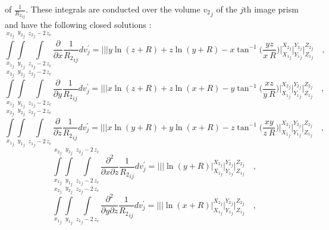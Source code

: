 \documentclass[journal abbreviation, manuscript]{copernicus}
\begin{document}
of ${\frac{1}{{R_2}_{ij}}}$.
These integrals are conducted over the volume ${v_{2}}_{j}$ of the $j$th image prism and have the following closed solutions \citep{Nagyetal2000, Nagyetal2002}:
\begin{equation}
\int\limits_{{x_{1}}_{j}}^{{x_{2}}_{j}} \int\limits_{{y_{1}}_{j}}^{{y_{2}}_{j}} \int\limits_{{z_{1}}_{j} - 2 \, z_c}^{{z_{2}}_{j} - 2 \, z_c}
\frac{\partial }{\partial x} {\frac{1}{{R_2}_{ij}}} dv_{j}^{\prime} =
\Bigg|\Bigg|\Bigg| 
y \ln(z + R) + z \ln(y + R) -  x  \tan^{-1} \Bigg( \frac{yz}{x \: R} \Bigg) 
\Bigg|_{{X_1}_{j}}^{{X_2}_{j}} \Bigg|_{{Y_1}_{j}}^{{Y_2}_{j}} \Bigg|_{{Z_1}_{j}}^{{Z_2}_{j}} \quad ,
\label{dx2}
\end{equation}
\begin{equation}
\int\limits_{{x_{1}}_{j}}^{{x_{2}}_{j}} \int\limits_{{y_{1}}_{j}}^{{y_{2}}_{j}} \int\limits_{{z_{1}}_{j} - 2 \, z_c}^{{z_{2}}_{j} - 2 \, z_c}
\frac{\partial }{\partial y} {\frac{1}{{R_2}_{ij}}} dv_{j}^{\prime} =
\Bigg|\Bigg|\Bigg|
x \ln(z + R) + z \ln(x + R) -  y  \tan^{-1} \Bigg( \frac{xz}{y \: R} 
\Bigg)
\Bigg|_{{X_1}_{j}}^{{X_2}_{j}} \Bigg|_{{Y_1}_{j}}^{{Y_2}_{j}} \Bigg|_{{Z_1}_{j}}^{{Z_2}_{j}} \quad ,
\label{dy2}
\end{equation}
\begin{equation}
\int\limits_{{x_{1}}_{j}}^{{x_{2}}_{j}} \int\limits_{{y_{1}}_{j}}^{{y_{2}}_{j}} \int\limits_{{z_{1}}_{j} - 2 \, z_c}^{{z_{2}}_{j} - 2 \, z_c}
\frac{\partial }{\partial z} {\frac{1}{{R_2}_{ij}}} dv_{j}^{\prime} =
\Bigg|\Bigg|\Bigg|
x \ln(y + R) + y \ln(x + R) -  z  \tan^{-1} \Bigg( \frac{xy}{z \: R} \Bigg) 
\Bigg|_{{X_1}_{j}}^{{X_2}_{j}} \Bigg|_{{Y_1}_{j}}^{{Y_2}_{j}} \Bigg|_{{Z_1}_{j}}^{{Z_2}_{j}} \quad ,
\label{dz2}
\end{equation}
\begin{equation}
\int\limits_{{x_{1}}_{j}}^{{x_{2}}_{j}} \int\limits_{{y_{1}}_{j}}^{{y_{2}}_{j}} \int\limits_{{z_{1}}_{j} - 2 \, z_c}^{{z_{2}}_{j} - 2 \, z_c}
\frac{\partial^{2}  }{\partial x \partial z} {\frac{1}{{R_2}_{ij}}} dv_{j}^{\prime} = \Bigg|\Bigg|\Bigg| 
\ln(y + R)
\Bigg|_{{X_1}_{j}}^{{X_2}_{j}} \Bigg|_{{Y_1}_{j}}^{{Y_2}_{j}} \Bigg|_{{Z_1}_{j}}^{{Z_2}_{j}} \quad ,
\label{dxz2}
\end{equation}
\begin{equation}
\int\limits_{{x_{1}}_{j}}^{{x_{2}}_{j}} \int\limits_{{y_{1}}_{j}}^{{y_{2}}_{j}} \int\limits_{{z_{1}}_{j} - 2 \, z_c}^{{z_{2}}_{j} - 2 \, z_c}
\frac{\partial^{2}  }{\partial y \partial z} {\frac{1}{{R_2}_{ij}}} dv_{j}^{\prime} =
\Bigg|\Bigg|\Bigg|
\ln(x + R)
\Bigg|_{{X_1}_{j}}^{{X_2}_{j}} \Bigg|_{{Y_1}_{j}}^{{Y_2}_{j}} \Bigg|_{{Z_1}_{j}}^{{Z_2}_{j}} \quad ,
\label{dyz2}
\end{equation}
\end{document}
